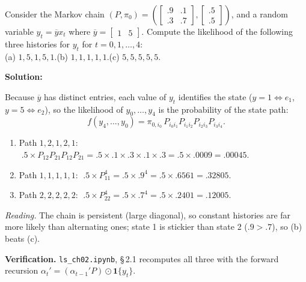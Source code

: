 \documentclass[12pt, letterpaper]{article}
\newcommand{\yb}{\overline{y}}
\newcommand{\nb}[1]{\texttt{ls\_ch02.ipynb}, \S\,#1}
\begin{document}
\begin{tcolorbox}[oddbox,title={Exercise 2.1 \quad Likelihood of Three Histories}]
\begin{tcolorbox}[questionbox]
Consider the Markov chain $(P,\pi_0)=\left(\begin{bmatrix}.9&.1\\.3&.7\end{bmatrix},
\begin{bmatrix}.5\\.5\end{bmatrix}\right)$, and a random variable $y_t=\yb x_t$ where
$\yb=\begin{bmatrix}1&5\end{bmatrix}$. Compute the likelihood of the following three histories
for $y_t$ for $t=0,1,\dots,4$:\\[3pt]
(a) $1,5,1,5,1$.\quad (b) $1,1,1,1,1$.\quad (c) $5,5,5,5,5$.
\end{tcolorbox}

\textbf{Solution:}

Because $\yb$ has distinct entries, each value of $y_t$ identifies the state ($y=1\Leftrightarrow
e_1$, $y=5\Leftrightarrow e_2$), so the likelihood of $y_0,\dots,y_4$ is the probability of the
state path:
\[
f(y_4,\dots,y_0)=\pi_{0,i_0}\,P_{i_0i_1}P_{i_1i_2}P_{i_2i_3}P_{i_3i_4}.
\]
\begin{enumerate}
\item Path $1,2,1,2,1$: $\;.5\times P_{12}P_{21}P_{12}P_{21}=.5\times.1\times.3\times.1\times.3
=.5\times.0009=\boxed{.00045}$.
\item Path $1,1,1,1,1$: $\;.5\times P_{11}^4=.5\times .9^4=.5\times .6561=\boxed{.32805}$.
\item Path $2,2,2,2,2$: $\;.5\times P_{22}^4=.5\times .7^4=.5\times .2401=\boxed{.12005}$.
\end{enumerate}
\emph{Reading.} The chain is persistent (large diagonal), so constant histories are far more likely
than alternating ones; state 1 is stickier than state 2 ($.9>.7$), so (b) beats (c).

\textbf{Verification.} \nb{2.1} recomputes all three with the forward recursion
$\alpha_t'=(\alpha_{t-1}'P)\odot\mathbf 1\{y_t\}$. \checkmark
\end{tcolorbox}
\end{document}
